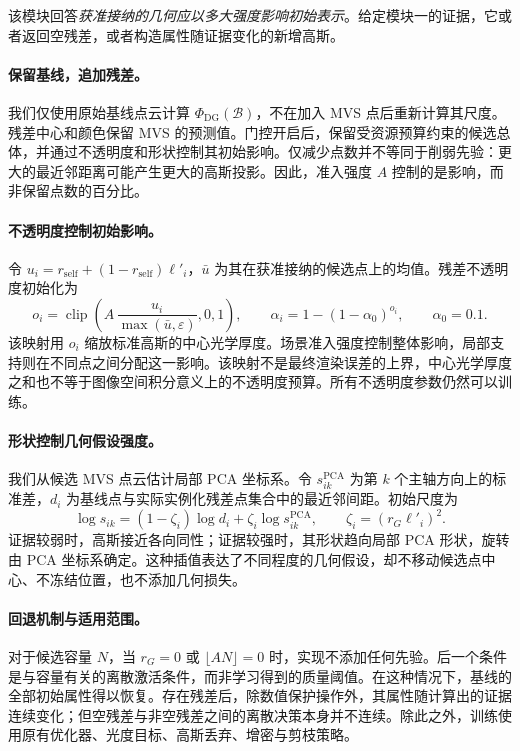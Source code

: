 \documentclass{article}
\newcommand{\rself}{r_{\mathrm{self}}}
\newcommand{\PhiDG}{\Phi_{\mathrm{DG}}}
\DeclareMathOperator{\clip}{clip}
\begin{document}
该模块回答\emph{获准接纳的几何应以多大强度影响初始表示}。给定模块一的证据，它或者返回空残差，或者构造属性随证据变化的新增高斯。

\paragraph{保留基线，追加残差。}
我们仅使用原始基线点云计算 $\PhiDG(\mathcal B)$，不在加入 MVS 点后重新计算其尺度。残差中心和颜色保留 MVS 的预测值。门控开启后，保留受资源预算约束的候选总体，并通过不透明度和形状控制其初始影响。仅减少点数并不等同于削弱先验：更大的最近邻距离可能产生更大的高斯投影。因此，准入强度 $A$ 控制的是影响，而非保留点数的百分比。

\paragraph{不透明度控制初始影响。}
令 $u_i=\rself+(1-\rself)\ell'_i$，$\bar u$ 为其在获准接纳的候选点上的均值。残差不透明度初始化为
\begin{equation}
o_i=\clip\!\left(A\,\frac{u_i}{\max(\bar u,\varepsilon)},0,1\right),
\qquad
\alpha_i=1-(1-\alpha_0)^{o_i},
\qquad \alpha_0=0.1.
\label{eq:opacity}
\end{equation}
该映射用 $o_i$ 缩放标准高斯的中心光学厚度。场景准入强度控制整体影响，局部支持则在不同点之间分配这一影响。该映射不是最终渲染误差的上界，中心光学厚度之和也不等于图像空间积分意义上的不透明度预算。所有不透明度参数仍然可以训练。

\paragraph{形状控制几何假设强度。}
我们从候选 MVS 点云估计局部 PCA 坐标系。令 $s^{\mathrm{PCA}}_{ik}$ 为第 $k$ 个主轴方向上的标准差，$d_i$ 为基线点与实际实例化残差点集合中的最近邻间距。初始尺度为
\begin{equation}
\log s_{ik}=(1-\zeta_i)\log d_i+
\zeta_i\log s^{\mathrm{PCA}}_{ik},
\qquad
\zeta_i=(r_G\ell'_i)^2.
\label{eq:shape}
\end{equation}
证据较弱时，高斯接近各向同性；证据较强时，其形状趋向局部 PCA 形状，旋转由 PCA 坐标系确定。这种插值表达了不同程度的几何假设，却不移动候选点中心、不冻结位置，也不添加几何损失。

\paragraph{回退机制与适用范围。}
对于候选容量 $N$，当 $r_G=0$ 或 $\lfloor AN\rfloor=0$ 时，实现不添加任何先验。后一个条件是与容量有关的离散激活条件，而非学习得到的质量阈值。在这种情况下，基线的全部初始属性得以恢复。存在残差后，除数值保护操作外，其属性随计算出的证据连续变化；但空残差与非空残差之间的离散决策本身并不连续。除此之外，训练使用原有优化器、光度目标、高斯丢弃、增密与剪枝策略。
\end{document}
